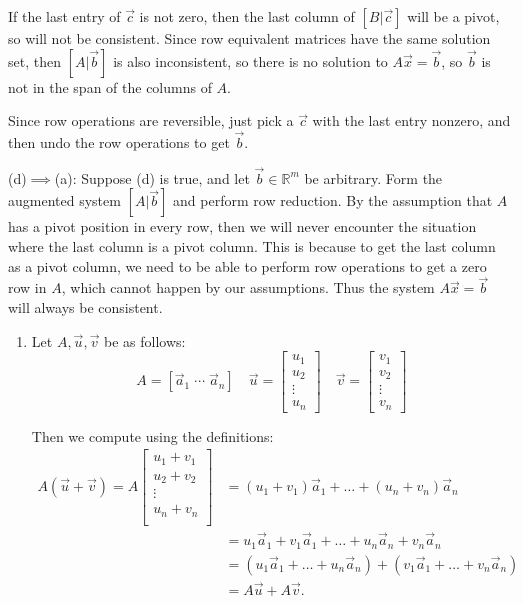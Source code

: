 \documentclass[12pt,letterpaper]{article}
\begin{document}
\begin{enumerate}
  If the last entry of $\vec{c}$ is not zero, then the last column of $[B|\vec{c}]$ will be a pivot, so will not be consistent. Since row equivalent matrices have the same solution set, then $[A|\vec{b}]$ is also inconsistent, so there is no solution to $A\vec{x}=\vec{b}$, so $\vec{b}$ is not in the span of the columns of $A$.

  Since row operations are reversible, just pick a $\vec{c}$ with the last entry nonzero, and then undo the row operations to get $\vec{b}$. 

  (d)$\implies$(a): Suppose (d) is true, and let $\vec{b}\in \mathbb{R}^m$ be arbitrary. Form the augmented system $[A|\vec{b}]$ and perform row reduction. By the assumption that $A$ has a pivot position in every row, then we will never encounter the situation where the last column is a pivot column. This is because to get the last column as a pivot column, we need to be able to perform row operations to get a zero row in $A$, which cannot happen by our assumptions. Thus the system $A\vec{x}=\vec{b}$ will always be consistent.

  \Answer
  \begin{enumerate}
  \item Let $A,\vec{u},\vec{v}$ be as follows:
    \[
      A = \left[
        \vec{a}_1 \; \cdots \; \vec{a}_n
      \right]\quad \vec{u}=
      \left[
        \begin{array}{c}
          u_1\\
          u_2\\
          \vdots\\
          u_n
        \end{array}
      \right]\quad \vec{v}=
      \left[
        \begin{array}{c}
          v_1\\
          v_2\\
          \vdots\\
          v_n
        \end{array}
      \right]
    \]

    Then we compute using the definitions:
\begin{align*}
A(\vec{u}+\vec{v})= A \begin{bmatrix}
u_1+v_1\\
u_2+v_2\\
\vdots\\
u_n+v_n\\
\end{bmatrix}&= (u_1+v_1)\vec{a}_1+\dots+(u_n+v_n)\vec{a}_n\\
&= u_1\vec{a}_1+v_1\vec{a}_1+\dots+u_n\vec{a}_n+v_n\vec{a}_n\\
&= (u_1\vec{a}_1+\dots+u_n\vec{a}_n)+(v_1\vec{a}_1+\dots+v_n\vec{a}_n)\\
&=A\vec{u}+A\vec{v}.
\end{align*}
    

\end{enumerate}
\end{enumerate}
\end{document}
